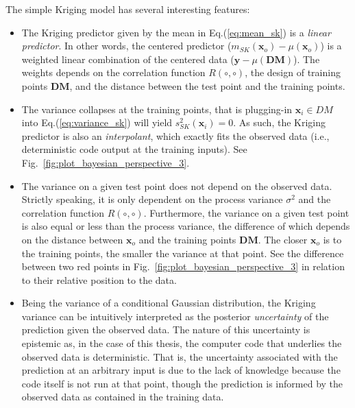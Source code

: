 The simple Kriging model has several interesting features:
\begin{itemize}
	\item The Kriging predictor given by the mean in Eq.(\ref{eq:mean_sk}) is a \emph{linear predictor}. 
	      In other words, the centered predictor ($m_{SK}(\mathbf{x}_o) - \mu (\mathbf{x}_o)$)  is a weighted linear combination of the centered data 
	      ($\mathbf{y} - \mu(\mathbf{DM})$).
				The weights depends on the correlation function $R(\circ,\circ)$, the design of training points $\mathbf{DM}$, and the distance between the test point and the training points.
	\item The variance collapses at the training points, that is plugging-in $\mathbf{x}_i \in DM$ into Eq.(\ref{eq:variance_sk}) will yield $s^2_{SK}(\mathbf{x}_i) = 0$.
	      As such, the Kriging predictor is also an \emph{interpolant}, which exactly fits the observed data (i.e., deterministic code output at the training inputs).
				See Fig.~\ref{fig:plot_bayesian_perspective_3}.
	\item The variance on a given test point does not depend on the observed data.
	      Strictly speaking, it is only dependent on the process variance $\sigma^2$ and the correlation function $R(\circ,\circ)$.
				Furthermore, the variance on a given test point is also equal or less than the process variance, 
				the difference of which depends on the distance between $\mathbf{x}_o$ and the training points $\mathbf{DM}$.
				The closer $\mathbf{x}_o$ is to the training points, the smaller the variance at that point.
				See the difference between two red points in Fig.~\ref{fig:plot_bayesian_perspective_3} in relation to their relative position to the data.
	\item Being the variance of a conditional Gaussian distribution, the Kriging variance can be intuitively interpreted as the posterior \emph{uncertainty} of the prediction given the observed data.
	      The nature of this uncertainty is epistemic as, in the case of this thesis, the computer code that underlies the observed data is deterministic.
				That is, the uncertainty associated with the prediction at an arbitrary input is due to the lack of knowledge because the code itself is not run at that point,
				though the prediction is informed by the observed data as contained in the training data.
\end{itemize}

